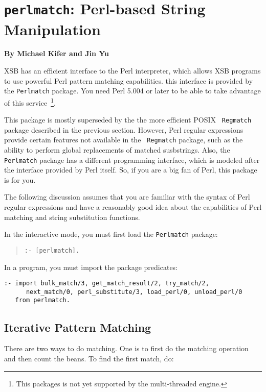 \chapter{{\tt perlmatch}: Perl-based String Manipulation}

\begin{center}
{\Large {\bf By Michael Kifer and  Jin Yu }}
\end{center}

XSB has an efficient interface to the Perl interpreter, which allows
XSB programs to use powerful Perl pattern matching capabilities. this
interface is provided by the {\tt Perlmatch} package. You need Perl
5.004 or later to be able to take advantage of this
service~\footnote{This packages is not yet supported by the
  multi-threaded engine.}.

This package is mostly superseded by the the more efficient POSIX {\tt
  Regmatch} package described in the previous section. However, Perl
regular expressions provide certain features not available in the {\tt
  Regmatch} package, such as the ability to perform global
replacements of matched susbstrings. Also, the {\tt Perlmatch} package
has a different programming interface, which is modeled after the
interface provided by Perl itself. So, if you are a big fan of Perl,
this package is for you.

The following discussion assumes that you are familiar with the syntax of
Perl regular expressions and have a reasonably good idea about the
capabilities of Perl matching and string substitution functions.

In the interactive mode, you must first load the {\tt Perlmatch}  package:
\begin{quote}
 {\tt  :- [perlmatch]. }
\end{quote}

In a program, you must import the package predicates:
\begin{verbatim}
:- import bulk_match/3, get_match_result/2, try_match/2,
	  next_match/0, perl_substitute/3, load_perl/0, unload_perl/0
   from perlmatch.
\end{verbatim}

\section{Iterative Pattern Matching}
There are two ways to do matching. One is to first do the matching
operation and then count the beans. To find the first match, do:

